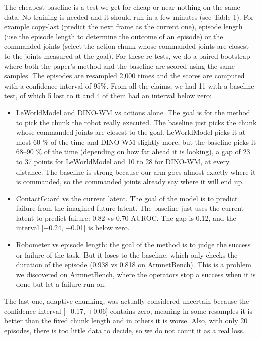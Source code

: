 \documentclass[10pt,twocolumn]{article}
\begin{document}
The cheapest baseline is a test we get for cheap or near nothing on the same data. No training is needed and it should run in a few minutes (see Table 1). For example copy-last (predict the next frame as the current one), episode length (use the episode length to determine the outcome of an episode) or the commanded joints (select the action chunk whose commanded joints are closest to the joints measured at the goal). For these re-tests, we do a paired bootstrap where both the paper's method and the baseline are scored using the same samples. The episodes are resampled 2,000 times and the scores are computed with a confidence interval of 95\%.
From all the claims, we had 11 with a baseline test, of which 5 lost to it and 4 of them had an interval below zero:


\begin{itemize}\setlength{\itemsep}{0pt}\setlength{\parskip}{0pt}\footnotesize
\item LeWorldModel and DINO-WM vs actions alone. The goal is for the method to pick the chunk the robot really executed. The baseline just picks the chunk whose commanded joints are closest to the goal. LeWorldModel picks it at most 60 \% of the time and DINO-WM slightly more, but the baseline picks it 68--90 \% of the time (depending on how far ahead it is looking), a gap of 23 to 37 points for LeWorldModel and 10 to 28 for DINO-WM, at every distance. The baseline is strong because our arm goes almost exactly where it is commanded, so the commanded joints already say where it will end up.
\item ContactGuard vs the current latent. The goal of the model is to predict failure from the imagined future latent. The baseline just uses the current latent to predict failure: 0.82 vs 0.70 AUROC. The gap is 0.12, and the interval [$-$0.24, $-$0.01] is below zero.
\item Robometer vs episode length: the goal of the method is to judge the success or failure of the task. But it loses to the baseline, which only checks the duration of the episode (0.938 vs 0.818 on ArmnetBench). This is a problem we discovered on ArmnetBench, where the operators stop a success when it is done but let a failure run on.
\end{itemize}


The last one, adaptive chunking, was actually considered uncertain because the confidence interval [$-$0.17, +0.06] contains zero, meaning in some resamples it is better than the fixed chunk length and in others it is worse. Also, with only 20 episodes, there is too little data to decide, so we do not count it as a real loss.
\end{document}
